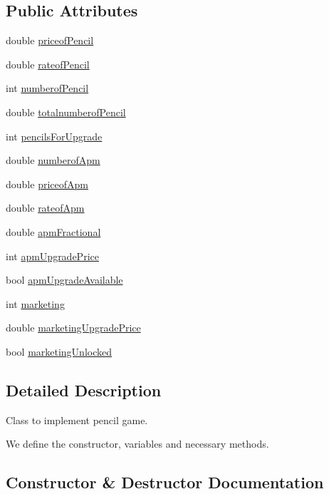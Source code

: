 \subsection*{Public Attributes}
\begin{DoxyCompactItemize}
\item 
double \hyperlink{classPencil_a71779a08ea791bf285d7e7d901d49d96}{priceof\+Pencil}
\item 
double \hyperlink{classPencil_acc8e87622507eb7d7b6802c561bbf4b5}{rateof\+Pencil}
\item 
int \hyperlink{classPencil_a42f809cbd4230815aed7212fe148367c}{numberof\+Pencil}
\item 
double \hyperlink{classPencil_a80b094bc36884ba078bc6e07c56871af}{totalnumberof\+Pencil}
\item 
int \hyperlink{classPencil_a0af93e74decc39b154f1248c2a987809}{pencils\+For\+Upgrade}
\item 
double \hyperlink{classPencil_a07127489c562b29b05f439ea380db9d0}{numberof\+Apm}
\item 
double \hyperlink{classPencil_a34a1a763466d2ea7408bf470adcf63f2}{priceof\+Apm}
\item 
double \hyperlink{classPencil_a5b8822d01032897b432fff6ac20d6fb5}{rateof\+Apm}
\item 
double \hyperlink{classPencil_a71b50db432298677e50884b34002bbcf}{apm\+Fractional}
\item 
int \hyperlink{classPencil_a1f05477be34cb47d39c3888fb1c4092c}{apm\+Upgrade\+Price}
\item 
bool \hyperlink{classPencil_a3d54aa5bf47e0f850640098fe1f64730}{apm\+Upgrade\+Available}
\item 
int \hyperlink{classPencil_a1bc69bd5b4a595710c48d68a2d276044}{marketing}
\item 
double \hyperlink{classPencil_a4d8be35743fd0687fcc95a4643594568}{marketing\+Upgrade\+Price}
\item 
bool \hyperlink{classPencil_a180f62c45b0d40ea3ef84038e40d1f55}{marketing\+Unlocked}
\end{DoxyCompactItemize}


\subsection{Detailed Description}
Class to implement pencil game. 

We define the constructor, variables and necessary methods. 

\subsection{Constructor \& Destructor Documentation}
\mbox{\label{classPencil_a0dbfad3eebde26e9d5dacace449d9e14}} 
